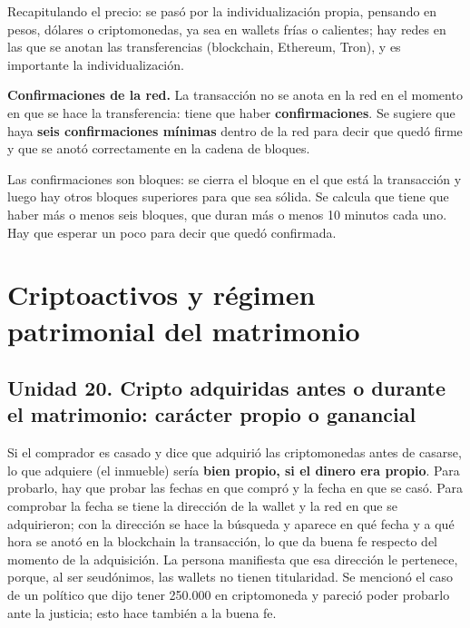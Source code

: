 \documentclass[12pt,oneside,a4paper]{book}
\begin{document}
Recapitulando el precio: se pasó por la individualización propia, pensando en pesos, dólares o criptomonedas, ya sea en wallets frías o calientes; hay redes en las que se anotan las transferencias (blockchain, Ethereum, Tron), y es importante la individualización.

\begin{important}
\textbf{Confirmaciones de la red.} La transacción no se anota en la red en el momento en que se hace la transferencia: tiene que haber \textbf{confirmaciones}. Se sugiere que haya \textbf{seis confirmaciones mínimas} dentro de la red para decir que quedó firme y que se anotó correctamente en la cadena de bloques.

Las confirmaciones son bloques: se cierra el bloque en el que está la transacción y luego hay otros bloques superiores para que sea sólida. Se calcula que tiene que haber más o menos seis bloques, que duran más o menos 10 minutos cada uno. Hay que esperar un poco para decir que quedó confirmada.
\end{important}

\chapter{Criptoactivos y régimen patrimonial del matrimonio}

\section{Unidad 20. Cripto adquiridas antes o durante el matrimonio: carácter propio o ganancial}

Si el comprador es casado y dice que adquirió las criptomonedas antes de casarse, lo que adquiere (el inmueble) sería \textbf{bien propio, si el dinero era propio}. Para probarlo, hay que probar las fechas en que compró y la fecha en que se casó. Para comprobar la fecha se tiene la dirección de la wallet y la red en que se adquirieron; con la dirección se hace la búsqueda y aparece en qué fecha y a qué hora se anotó en la blockchain la transacción, lo que da buena fe respecto del momento de la adquisición. La persona manifiesta que esa dirección le pertenece, porque, al ser seudónimos, las wallets no tienen titularidad. Se mencionó el caso de un político que dijo tener 250.000 en criptomoneda y pareció poder probarlo ante la justicia; esto hace también a la buena fe.
\end{document}
